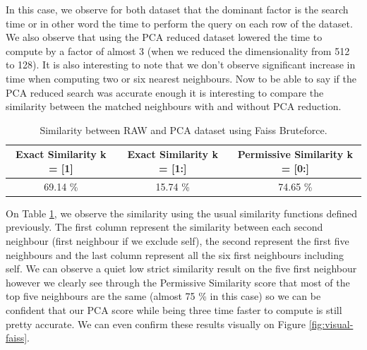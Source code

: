 \documentclass[a4paper]{article}
\begin{document}
In this case, we observe for both dataset that the dominant factor is the search time or in other word the time to perform the query on each row of the dataset. We also observe that using the PCA reduced dataset lowered the time to compute by a factor of almost 3 (when we reduced the dimensionality from 512 to 128). It is also interesting to note that we don't observe significant increase in time when computing two or six nearest neighbours. Now to be able to say if the PCA reduced search was accurate enough it is interesting to compare the similarity between the matched neighbours with and without PCA reduction.

\begin{table}[h]
	\centering
	\begin{tabular}{ | c | c | c |}
	\hline
		Exact Similarity k = [1] & Exact Similarity k = [1:] & Permissive Similarity k = [0:] \\ \hline
		69.14 \% & 15.74 \% & 74.65 \% \\ \hline
		
	\end{tabular}
	\caption{Similarity between RAW and PCA dataset using Faiss Bruteforce.}
	\label{table:sim-faiss-bruteforce}
\end{table}

On Table \ref{table:sim-faiss-bruteforce}, we observe the similarity using the usual similarity functions defined previously. The first column represent the similarity between each second neighbour (first neighbour if we exclude self), the second represent the first five neighbours and the last column represent all the six first neighbours including self. We can observe a quiet low strict similarity result on the five first neighbour however we clearly see through the Permissive Similarity score that most of the top five neighbours are the same (almost 75 \% in this case) so we can be confident that our PCA score while being three time faster to compute is still pretty accurate. We can even confirm these results visually on Figure \ref{fig:visual-faiss}.
\end{document}
